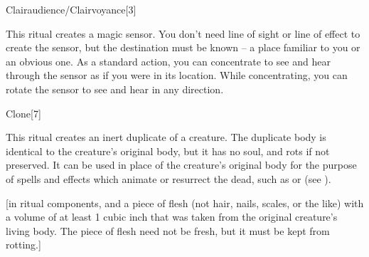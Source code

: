 \begin{spellsection}{Clairaudience/Clairvoyance}[3]
    \begin{spellheader}
    \end{spellheader}
    \begin{spellcontent}
        \begin{spelltargetinginfo}
            \spellrng{\rngext \rngunrestricted}
        \end{spelltargetinginfo}
        \begin{spelleffects}

            \spellline
            \spelleffect This ritual creates a magic sensor. You don't need line of sight or line of effect to create the sensor, but the destination must be known -- a place familiar to you or an obvious one. As a standard action, you can concentrate to see and hear through the sensor as if you were in its location. While concentrating, you can rotate the sensor to see and hear in any direction.
            \spelldur \durmed \dismissable
        \end{spelleffects}
    \end{spellcontent}
    \begin{spellfooter}
        \spellnotes \sensorspellnotes
    \end{spellfooter}
\end{spellsection}

\begin{spellsection}{Clone}[7]
    \begin{spellheader}
    \end{spellheader}
    \begin{spellcontent}
        \begin{spelltargetinginfo}
        \end{spelltargetinginfo}
        \begin{spelleffects}

            \spelleffect This ritual creates an inert duplicate of a creature. The duplicate body is identical to the creature's original body, but it has no soul, and rots if not preserved. It can be used in place of the creature's original body for the purpose of spells and effects which animate or resurrect the dead, such as  or  (see ).
        \end{spelleffects}
    \end{spellcontent}
    \begin{spellfooter}
        [in ritual components, and a piece of flesh (not hair, nails, scales, or the like) with a volume of at least 1 cubic inch that was taken from the original creature's living body. The piece of flesh need not be fresh, but it must be kept from rotting.]
    \end{spellfooter}
\end{spellsection}

